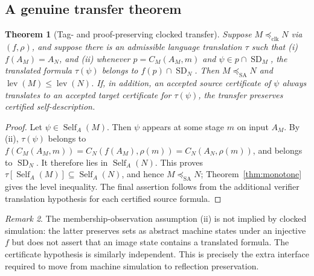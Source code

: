\documentclass[11pt,letterpaper]{article}
\newtheorem{theorem}{Theorem}[section]
\theoremstyle{definition}\newtheorem{definition}[theorem]{Definition}\newtheorem{example}[theorem]{Example}\newtheorem{protocol}[theorem]{Protocol}\newtheorem{question}[theorem]{Open Problem}
\theoremstyle{remark}\newtheorem{remark}[theorem]{Remark}
\newcommand{\Self}{\operatorname{Self}}
\newcommand{\SD}{\operatorname{SD}}
\newcommand{\lev}{\operatorname{lev}}
\newcommand{\clksim}{\preceq_{\mathrm{clk}}}
\newcommand{\sas}{\preceq_{\mathrm{SA}}}
\begin{document}
\subsection{A genuine transfer theorem}
\begin{theorem}[Tag- and proof-preserving clocked transfer]\label{thm:transfer}
Suppose $M\clksim N$ via $(f,\rho)$, and suppose there is an admissible language translation $\tau$ such that (i) $f(A_M)=A_N$, and (ii) whenever $p=C_M(A_M,m)$ and $\psi\in p\cap\SD_M$, the translated formula $\tau(\psi)$ belongs to $f(p)\cap\SD_N$. Then $M\sas N$ and $\lev(M)\le\lev(N)$. If, in addition, an accepted source certificate of $\psi$ always translates to an accepted target certificate for $\tau(\psi)$, the transfer preserves certified self-description.
\end{theorem}
\begin{proof}
Let $\psi\in\Self_A(M)$. Then $\psi$ appears at some stage $m$ on input $A_M$. By (ii), $\tau(\psi)$ belongs to $f(C_M(A_M,m))=C_N(f(A_M),\rho(m))=C_N(A_N,\rho(m))$, and belongs to $\SD_N$. It therefore lies in $\Self_A(N)$. This proves $\tau[\Self_A(M)]\subseteq\Self_A(N)$, and hence $M\sas N$; Theorem~\ref{thm:monotone} gives the level inequality. The final assertion follows from the additional verifier translation hypothesis for each certified source formula.
\end{proof}
\begin{remark}
The membership-observation assumption (ii) is not implied by clocked simulation: the latter preserves sets as abstract machine states under an injective $f$ but does not assert that an image state contains a translated formula. The certificate hypothesis is similarly independent. This is precisely the extra interface required to move from machine simulation to reflection preservation.
\end{remark}
\end{document}
